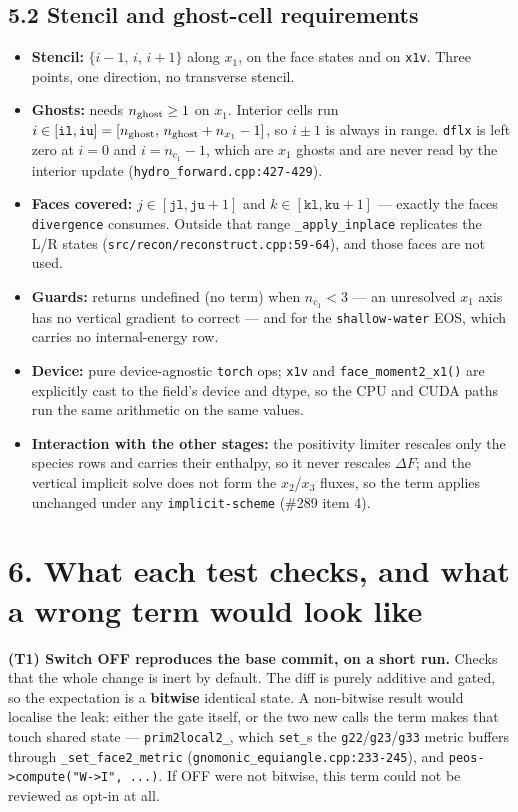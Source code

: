 \documentclass[11pt,a4paper]{article}
\begin{document}
\subsection*{5.2 Stencil and ghost-cell requirements}

\begin{itemize}
\item \textbf{Stencil:} $\{i-1,\,i,\,i+1\}$ along $x_1$, on the face states and on \texttt{x1v}.
  Three points, one direction, no transverse stencil.
\item \textbf{Ghosts:} needs $n_{\rm ghost}\ge1$ on $x_1$. Interior cells run
  $i\in[\texttt{il},\texttt{iu}]=[n_{\rm ghost},\,n_{\rm ghost}+n_{x_1}-1]$, so
  $i\pm1$ is always in range. \texttt{dflx} is left zero at $i=0$ and $i=n_{c_1}-1$,
  which are $x_1$ ghosts and are never read by the interior update
  (\texttt{hydro\_forward.cpp:427-429}).
\item \textbf{Faces covered:} $j\in[\texttt{jl},\texttt{ju}{+}1]$ and
  $k\in[\texttt{kl},\texttt{ku}{+}1]$ — exactly the faces \texttt{divergence} consumes.
  Outside that range \texttt{\_apply\_inplace} replicates the L/R states
  (\texttt{src/recon/reconstruct.cpp:59-64}), and those faces are not used.
\item \textbf{Guards:} returns undefined (no term) when $n_{c_1}<3$ — an unresolved $x_1$
  axis has no vertical gradient to correct — and for the \texttt{shallow-water} EOS,
  which carries no internal-energy row.
\item \textbf{Device:} pure device-agnostic \texttt{torch} ops; \texttt{x1v} and \texttt{face\_moment2\_x1()} are
  explicitly cast to the field's device and dtype, so the CPU and CUDA paths run
  the same arithmetic on the same values.
\item \textbf{Interaction with the other stages:} the positivity limiter rescales only the
  species rows and carries their enthalpy, so it never rescales $\Delta F$; and
  the vertical implicit solve does not form the $x_2$/$x_3$ fluxes, so the term
  applies unchanged under any \texttt{implicit-scheme} (\#289 item 4).
\end{itemize}

\hrulefill

\section*{6. What each test checks, and what a wrong term would look like}

\textbf{(T1) Switch OFF reproduces the base commit, on a short run.}
Checks that the whole change is inert by default. The diff is purely additive and
gated, so the expectation is a \textbf{bitwise} identical state. A non-bitwise result
would localise the leak: either the gate itself, or the two new calls the term
makes that touch shared state — \texttt{prim2local2\_}, which \texttt{set\_}s the
\texttt{g22}/\texttt{g23}/\texttt{g33} metric buffers through \texttt{\_set\_face2\_metric}
(\texttt{gnomonic\_equiangle.cpp:233-245}), and \texttt{peos->compute("W->I", ...)}. If OFF were
not bitwise, this term could not be reviewed as opt-in at all.
\end{document}
